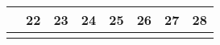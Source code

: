 {\begin{tabularx}{\linewidth}{|l!{\vrule width \myLenLineThicknessThick}*{7}{@{}X@{}|}}
      
        \\  \hline 
      
    
  
  
  
  \hyperlink{week-2027-47}{} &
    
      
      
        \begin{minipage}[t]{6mm}\centering{}22\end{minipage}
      
       & 
    
      
      
        \begin{minipage}[t]{6mm}\centering{}23\end{minipage}
      
       & 
    
      
      
        \begin{minipage}[t]{6mm}\centering{}24\end{minipage}
      
       & 
    
      
      
        \begin{minipage}[t]{6mm}\centering{}25\end{minipage}
      
       & 
    
      
      
        \begin{minipage}[t]{6mm}\centering{}26\end{minipage}
      
       & 
    
      
      
        \begin{minipage}[t]{6mm}\centering{}27\end{minipage}
      
       & 
    
      
      
        \begin{minipage}[t]{6mm}\centering{}28\end{minipage}
      
      
        \\  \hline 
      
    
  
  
  
  \hyperlink{week-2027-48}{} &
    

\end{tabularx}}
